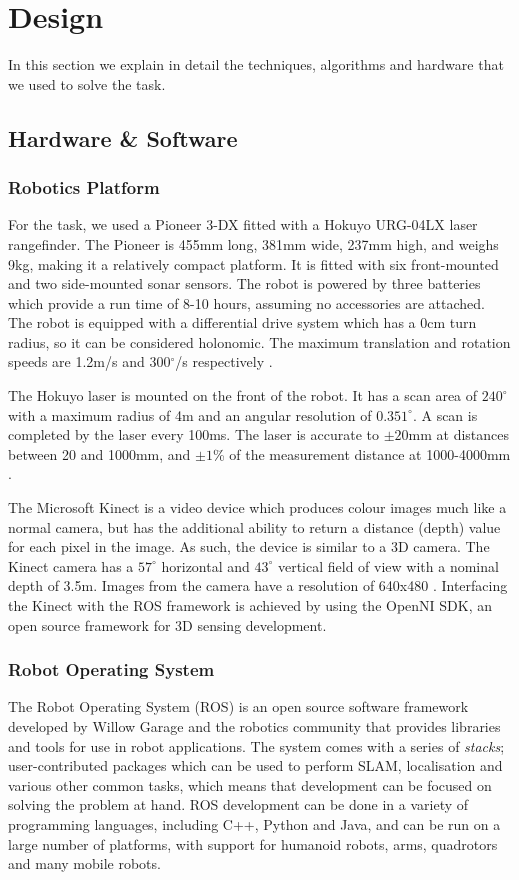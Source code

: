 \documentclass[conference]{IEEEtran}
\begin{document}
\section{Design}
In this section we explain in detail the techniques, algorithms and hardware that we used to solve the task.
\subsection{Hardware \& Software}
\subsubsection{Robotics Platform}

For the task, we used a Pioneer 3-DX fitted with a Hokuyo URG-04LX laser rangefinder. The Pioneer is 455mm long, 381mm wide, 237mm high, and weighs 9kg, making it a relatively compact platform. It is fitted with six front-mounted and two side-mounted sonar sensors. The robot is powered by three batteries which provide a run time of 8-10 hours, assuming no accessories are attached. The robot is equipped with a differential drive system which has a 0cm turn radius, so it can be considered holonomic. The maximum translation and rotation speeds are 1.2m/s and 300$^\circ$/s respectively \cite{pioneer}. 

The Hokuyo laser is mounted on the front of the robot. It has a scan area of $240^\circ$ with a maximum radius of 4m and an angular resolution of $0.351^\circ$. A scan is completed by the laser every 100ms. The laser is accurate to $\pm 20$mm at distances between 20 and 1000mm, and $\pm 1$\% of the measurement distance at 1000-4000mm \cite{hokuyo}.

The Microsoft Kinect is a video device which produces colour images much like a normal camera, but has the additional ability to return a distance (depth) value for each pixel in the image. As such, the device is similar to a 3D camera. The Kinect camera has a $57^\circ$ horizontal and $43^\circ$ vertical field of view with a nominal depth of 3.5m. Images from the camera have a resolution of 640x480 \cite{Kinect}. Interfacing the Kinect with the ROS framework is achieved by using the OpenNI SDK, an open source framework for 3D sensing development.
\subsubsection{Robot Operating System}
The Robot Operating System (ROS) is an open source software framework developed by Willow Garage and the robotics community that provides libraries and tools for use in robot applications. The system comes with a series of \emph{stacks}; user-contributed packages which can be used to perform SLAM, localisation and various other common tasks, which means that development can be focused on solving the problem at hand. ROS development can be done in a variety of programming languages, including C++, Python and Java, and can be run on a large number of platforms, with support for humanoid robots, arms, quadrotors and many mobile robots.
\end{document}
